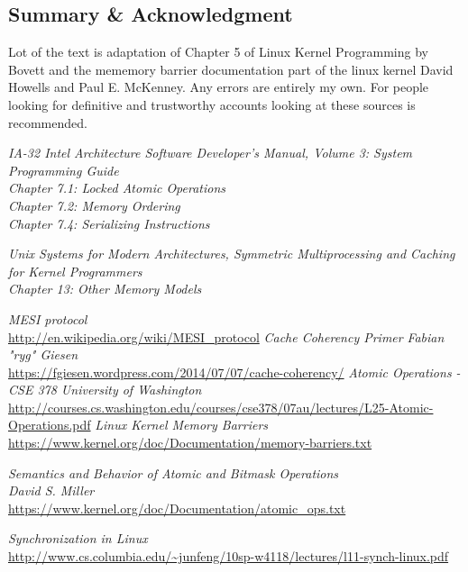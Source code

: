 \documentclass{article}
\begin{document}
\subsection{Summary \& Acknowledgment}

Lot of the text is adaptation of Chapter 5 of Linux Kernel Programming
by Bovett and the mememory barrier documentation part of the linux
kernel David Howells and Paul E. McKenney. Any errors are entirely my
own. For people looking for definitive and trustworthy accounts
looking at these sources is recommended.

\begin{thebibliography}{9}

  \textit{IA-32 Intel Architecture Software Developer's Manual, Volume 3:
    System Programming Guide} \\
  \textit{Chapter 7.1: Locked Atomic Operations} \\
  \textit{Chapter 7.2: Memory Ordering}  \\
  \textit{Chapter 7.4: Serializing Instructions}

  \textit{Unix Systems for Modern Architectures, Symmetric Multiprocessing and Caching
    for Kernel Programmers} \\
  \textit{Chapter 13: Other Memory Models}  
  
  \textit{MESI protocol}  \\
  \url{http://en.wikipedia.org/wiki/MESI_protocol}
  \textit{Cache Coherency Primer}  \textit{Fabian "ryg" Giesen} \\
  \url{https://fgiesen.wordpress.com/2014/07/07/cache-coherency/}
   \textit{Atomic Operations - CSE 378 University of Washington} \\
  \url{http://courses.cs.washington.edu/courses/cse378/07au/lectures/L25-Atomic-Operations.pdf}
  \textit{Linux Kernel Memory Barriers} \\
  \url{https://www.kernel.org/doc/Documentation/memory-barriers.txt}

  \textit{Semantics and Behavior of Atomic and Bitmask Operations} \\
  \textit{David S. Miller} \\
  \url{https://www.kernel.org/doc/Documentation/atomic_ops.txt}

  \textit{Synchronization in Linux} \\
  \url{http://www.cs.columbia.edu/~junfeng/10sp-w4118/lectures/l11-synch-linux.pdf}


\end{thebibliography}
\end{document}
